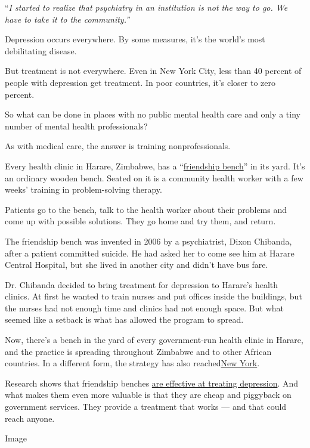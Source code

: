 ``\emph{I started to realize that psychiatry in an institution is not
the way to go. We have to take it to the community.''}

Depression occurs everywhere. By some measures, it's the world's most
debilitating disease.

But treatment is not everywhere. Even in New York City, less than 40
percent of people with depression get treatment. In poor countries, it's
closer to zero percent.

So what can be done in places with no public mental health care and only
a tiny number of mental health professionals?

As with medical care, the answer is training nonprofessionals.

Every health clinic in Harare, Zimbabwe, has a
``\href{https://www.friendshipbenchzimbabwe.org/}{friendship bench}'' in
its yard. It's an ordinary wooden bench. Seated on it is a community
health worker with a few weeks' training in problem-solving therapy.

Patients go to the bench, talk to the health worker about their problems
and come up with possible solutions. They go home and try them, and
return.

The friendship bench was invented in 2006 by a psychiatrist, Dixon
Chibanda, after a patient committed suicide. He had asked her to come
see him at Harare Central Hospital, but she lived in another city and
didn't have bus fare.

Dr. Chibanda decided to bring treatment for depression to Harare's
health clinics. At first he wanted to train nurses and put offices
inside the buildings, but the nurses had not enough time and clinics had
not enough space. But what seemed like a setback is what has allowed the
program to spread.

Now, there's a bench in the yard of every government-run health clinic
in Harare, and the practice is spreading throughout Zimbabwe and to
other African countries. In a different form, the strategy has also
reached\href{https://www.nytimes3xbfgragh.onion/2019/07/22/opinion/depressed-heres-a-bench-talk-to-me.html}{New
York}.

Research shows that friendship benches
\href{https://jamanetwork.com/journals/jama/fullarticle/2594719}{are
effective at treating depression}. And what makes them even more
valuable is that they are cheap and piggyback on government services.
They provide a treatment that works --- and that could reach anyone.

Image

